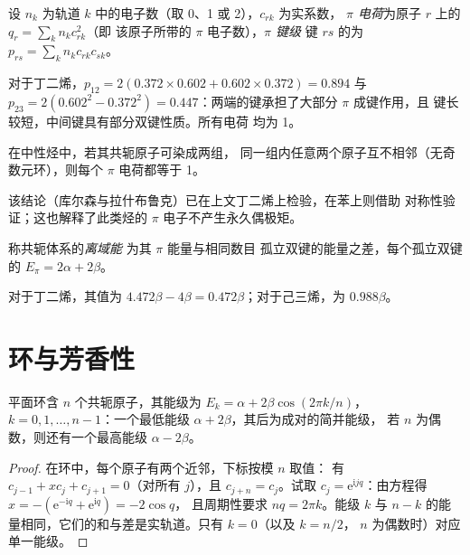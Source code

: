 \begin{definition}[$\pi$ 电荷与键级]\label{def:b2:huckel:indices}
设 $n_k$ 为轨道 $k$ 中的电子数（取 0、1 或 2），$c_{rk}$ 为实系数，
\emph{$\pi$ 电荷}为原子 $r$ 上的 $q_r = \sum_k n_kc_{rk}^2$（即
该原子所带的 $\pi$ 电子数），\emph{$\pi$ 键级}
键 $rs$ 的为 $p_{rs} = \sum_k n_kc_{rk}c_{sk}$。
\end{definition}

对于丁二烯，$p_{12} = 2(0.372 \times 0.602 + 0.602 \times 0.372) = 0.894$ 与 $p_{23} =
2(0.602^2 - 0.372^2) = 0.447$：两端的键承担了大部分 $\pi$ 成键作用，且
键长较短，中间键具有部分双键性质。所有电荷
均为 1。

\begin{proposition}[交错烃]\label{prop:b2:huckel:alternant}
在中性烃中，若其共轭原子可染成两组，
同一组内任意两个原子互不相邻（无奇数元环），则每个 $\pi$ 电荷都等于 1。
\end{proposition}

\admitted

该结论（库尔森与拉什布鲁克）已在上文丁二烯上检验，在苯上则借助
对称性验证；这也解释了此类烃的
$\pi$ 电子不产生永久偶极矩。

\begin{definition}[离域能]\label{def:b2:huckel:delocalisation}
称共轭体系的\emph{离域能}
为其 $\pi$ 能量与相同数目
孤立双键的能量之差，每个孤立双键的 $E_\pi = 2\alpha + 2\beta$。
\end{definition}

对于丁二烯，其值为 $4.472\beta - 4\beta = 0.472\beta$；对于己三烯，为 $0.988\beta$。

\section{环与芳香性}

\begin{theorem}[环的能级]\label{thm:b2:huckel:ring}
平面环含 $n$ 个共轭原子，其能级为 $E_k = \alpha + 2\beta\cos(2\pi k/n)$，
$k = 0, 1, \dots, n - 1$：一个最低能级 $\alpha + 2\beta$，其后为成对的简并能级，
若 $n$ 为偶数，则还有一个最高能级 $\alpha - 2\beta$。
\end{theorem}

\begin{proof}
在环中，每个原子有两个近邻，下标按模 $n$ 取值：
有 $c_{j-1} + xc_j + c_{j+1} = 0$（对所有 $j$），且 $c_{j+n} = c_j$。试取 $c_j = \mathrm e^{\mathrm
i jq}$：由方程得 $x = -(\mathrm e^{-\mathrm iq} + \mathrm e^{\mathrm iq}) = -2\cos q$，
且周期性要求 $nq = 2\pi k$。能级 $k$ 与 $n - k$
的能量相同，它们的和与差是实轨道。只有 $k = 0$（以及 $k = n/2$，
$n$ 为偶数时）对应单一能级。
\end{proof}

